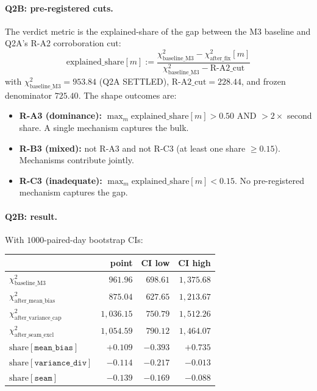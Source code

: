 \documentclass[11pt]{article}
\theoremstyle{definition}
\theoremstyle{plain}
\begin{document}
\paragraph{Q2B: pre-registered cuts.}
The verdict metric is the explained-share of the gap between the
M3 baseline and Q2A's R-A2 corroboration cut:
\[
\mathrm{explained\_share}[m] :=
\frac{\chi^{2}_{\mathrm{baseline\_M3}} - \chi^{2}_{\mathrm{after\_fix}}[m]}
{\chi^{2}_{\mathrm{baseline\_M3}} - \mathrm{R\text{-}A2\_cut}}
\]
with $\chi^{2}_{\mathrm{baseline\_M3}} = 953.84$ (Q2A SETTLED),
$\mathrm{R\text{-}A2\_cut} = 228.44$, and frozen denominator
$725.40$. The shape outcomes are:
\begin{itemize}[leftmargin=2em]
\item \textbf{R-A3 (dominance):} $\max_{m}
\mathrm{explained\_share}[m] > 0.50$ AND $> 2\times$ second
share. A single mechanism captures the bulk.
\item \textbf{R-B3 (mixed):} not R-A3 and not R-C3 (at least one
share $\geq 0.15$). Mechanisms contribute jointly.
\item \textbf{R-C3 (inadequate):} $\max_{m}
\mathrm{explained\_share}[m] < 0.15$. No pre-registered
mechanism captures the gap.
\end{itemize}

\paragraph{Q2B: result.}
With $1000$-paired-day bootstrap CIs:

\begin{center}
\begin{tabular}{lrrr}
\toprule
& point & CI low & CI high \\
\midrule
$\chi^{2}_{\mathrm{baseline\_M3}}$         & $961.96$  & $698.61$  & $1{,}375.68$ \\
$\chi^{2}_{\mathrm{after\_mean\_bias}}$    & $875.04$  & $627.65$  & $1{,}213.67$ \\
$\chi^{2}_{\mathrm{after\_variance\_cap}}$ & $1{,}036.15$ & $750.79$  & $1{,}512.26$ \\
$\chi^{2}_{\mathrm{after\_seam\_excl}}$    & $1{,}054.59$ & $790.12$  & $1{,}464.07$ \\
\midrule
$\mathrm{share}[\mathtt{mean\_bias}]$       & $+0.109$ & $-0.393$ & $+0.735$ \\
$\mathrm{share}[\mathtt{variance\_div}]$    & $-0.114$ & $-0.217$ & $-0.013$ \\
$\mathrm{share}[\mathtt{seam}]$             & $-0.139$ & $-0.169$ & $-0.088$ \\
\bottomrule
\end{tabular}
\end{center}
\end{document}

